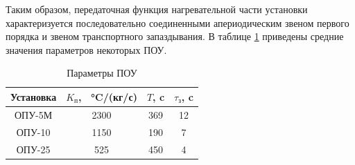 Таким образом, передаточная функция нагревательной части установки характеризуется последовательно соединенными апериодическим звеном первого порядка и звеном транспортного запаздывания. В таблице \ref{table:pasterizer_params} приведены средние значения параметров некоторых ПОУ.

\begin{table} [!h]
    \small
    \caption{Параметры ПОУ}\label{table:pasterizer_params}
    \centering
    \begin{tabular}{ | c | c | c | c | }
        \hline
        \textbf{Установка} & $K_\text{п}$, \SI{}{\celsius}/(кг/с) & $T$, c & $\tau_\text{з}$, c \\
        \hline
        ОПУ-5М             & 2300                                 & 369    & 12                 \\
        \hline
        ОПУ-10             & 1150                                 & 190    & 7                  \\
        \hline
        ОПУ-25             & 525                                  & 450    & 4                  \\
        \hline
    \end{tabular}
\end{table}
